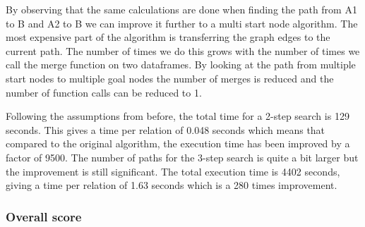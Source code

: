 By observing that the same calculations are done when finding the path from A1 to B and A2 to B we can improve it further to a multi start node algorithm. The most expensive part of the algorithm is transferring the graph edges to the current path. The number of times we do this grows with the number of times we call the merge function on two dataframes. By looking at the path from multiple start nodes to multiple goal nodes the number of merges is reduced and the number of function calls can be reduced to 1. 

Following the assumptions from before, the total time for a 2-step search is 129 seconds. This gives a time per relation of 0.048 seconds which means that compared to the original algorithm, the execution time has been improved by a factor of 9500. The number of paths for the 3-step search is quite a bit larger but the improvement is still significant. The total execution time is 4402 seconds, giving a time per relation of 1.63 seconds which is a 280 times improvement. 



\subsubsection{Overall score}

